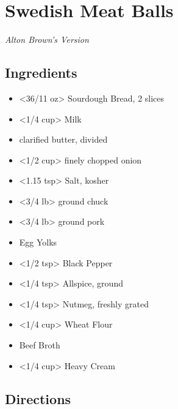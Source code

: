 \section{Swedish Meat Balls}
\textit{ Alton Brown's Version }

\subsection{ Ingredients }

\begin{itemize}
  \item <36/11 oz> Sourdough Bread, 2 slices
  \item <1/4 cup> Milk
  \item <3 tbs> clarified butter, divided
  \item <1/2 cup> finely chopped onion
  \item <1.15 tsp> Salt, kosher
  \item <3/4 lb> ground chuck
  \item <3/4 lb> ground pork
  \item <2 yolks> Egg Yolks
  \item <1/2 tsp> Black Pepper
  \item <1/4 tsp> Allspice, ground
  \item <1/4 tsp> Nutmeg, freshly grated
  \item <1/4 cup> Wheat Flour
  \item <3 cup> Beef Broth
  \item <1/4 cup> Heavy Cream
\end{itemize}

\subsection{ Directions }

